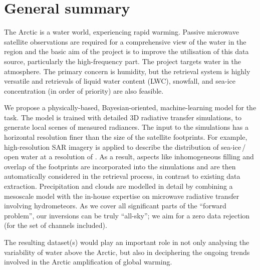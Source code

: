 \documentclass[12pt,oneside,a4paper]{article}
\begin{document}
	
	
	\thispagestyle{empty}
	\vspace*{-10mm}
	\noindent
	\textbf{\Large \LongTitle}




\section{General summary}
%
The Arctic is a water world, experiencing rapid warming. Passive microwave
satellite observations are required for a comprehensive view of the water in the region and the basic aim of the project is to improve the utilisation of this data source, particularly the high-frequency part. The project targets water in the atmosphere. The primary concern is humidity, but
the retrieval system is highly versatile and retrievals of liquid water  content (LWC), snowfall, and sea-ice concentration (in order of priority) are also
feasible.

We propose a physically-based, Bayesian-oriented, machine-learning model for
the task. The model is trained with detailed 3D radiative transfer simulations,
to generate local scenes of measured radiances. The input to the simulations
has a horizontal resolution finer than the size of the satellite footprints.
For example, high-resolution SAR imagery is applied to describe the
distribution of sea-ice\,/\,open water at a resolution of . As a result,
aspects like inhomogeneous filling and overlap of the footprints are
incorporated into the simulations and are then automatically considered in the
retrieval process, in contrast to existing data extraction. Precipitation and
clouds are modelled in detail by combining a mesoscale model with the in-house
expertise on microwave radiative transfer involving hydrometeors. As we cover
all significant parts of the ``forward problem'', our inversions can be truly
``all-sky''; we aim for a zero data rejection (for the set of channels
included).

The resulting dataset(s) would play an important role in not only analysing the
variability of water above the Arctic, but also in deciphering the
ongoing trends involved in the Arctic amplification of global warming.
\end{document}

